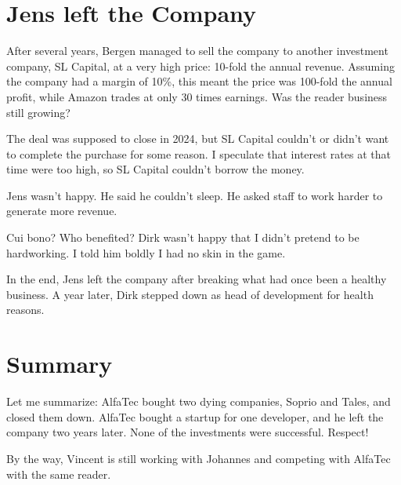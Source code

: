 \section{Jens left the Company}
After several years, Bergen managed to sell the company to another investment company, SL Capital,
at a very high price: 10-fold the annual revenue. Assuming the company had a margin of 10\%, 
this meant the price was 100-fold the annual profit, while Amazon trades at only 30 times earnings.
Was the reader business still growing? 

The deal was supposed to close in 2024, but SL Capital couldn't or didn't want to complete the purchase for some reason. 
I speculate that interest rates at that time were too high, so SL Capital couldn't 
borrow the money. 

Jens wasn't happy. He said he couldn't sleep. He asked staff to work harder to generate more revenue.

Cui bono? Who benefited? Dirk wasn't happy that I didn't pretend to be hardworking. 
I told him boldly I had no skin in the game.

In the end, Jens left the company after breaking what had once been a healthy business.
A year later, Dirk stepped down as head of development for health reasons.


\section{Summary}

Let me summarize: AlfaTec bought two dying companies, Soprio and Tales, and closed them down. AlfaTec bought a startup for one developer, and he left the company two years later. None of the investments were successful. Respect!

By the way, Vincent is still working with Johannes and competing with AlfaTec with the same reader.

